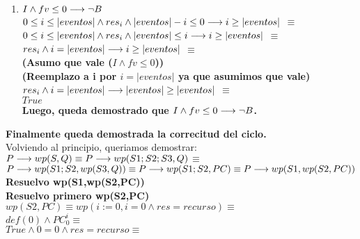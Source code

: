 \documentclass[10pt,a4paper]{article}
\begin{document}
\begin{flushleft}
\begin{enumerate}
	\item \textbf{$I \wedge fv\leq0 \longrightarrow \neg B$} \\
	\vspace{2mm}
	$0\leq i \leq |eventos| \wedge res_i \wedge |eventos|-i \leq 0 \longrightarrow i \geq |eventos|$ $\equiv$ \\
	\vspace{2mm}
	$0\leq i \leq |eventos| \wedge res_i \wedge |eventos| \leq i \longrightarrow i \geq |eventos|$ $\equiv$ \\
	\vspace{2mm}
	$ res_i \wedge i= |eventos| \longrightarrow i \geq |eventos|$ $\equiv$ \\
	\vspace{2mm}
	\textbf{(Asumo que vale ($I \wedge fv\leq0$)) }\\
	\vspace{2mm}
	\textbf{(Reemplazo a i por $i=|eventos|$ ya que asumimos que vale)}\\
	\vspace{2mm}
	$res_i \wedge i=|eventos| \longrightarrow |eventos| \geq |eventos|$ $\equiv$ \\
	$True$ \\
	\vspace{3mm}
	\textbf{Luego, queda demostrado que $I \wedge fv\leq0 \longrightarrow \neg B$.}
\end{enumerate}
\textbf{Finalmente queda demostrada la correcitud del ciclo.}\\
\vspace{2mm}
Volviendo al principio, queriamos demostrar:\\
$P \longrightarrow wp(S,Q) \equiv P\longrightarrow wp(S1;S2;S3,Q)$$ \equiv$\\
$P\longrightarrow wp(S1;S2,wp(S3,Q)) \equiv P\longrightarrow wp(S1;S2,PC) \equiv P\longrightarrow wp(S1,wp(S2,PC)) $\\
\vspace{3mm}
\textbf{Resuelvo wp(S1,wp(S2,PC))}\\
\vspace{2mm}
\textbf{Resuelvo primero wp(S2,PC)}\\
\vspace{2mm}
$wp(S2,PC) \equiv wp(i:=0,i=0 \wedge res=recurso)$$\equiv$\\
\vspace{2mm}
$def (0) \wedge PC_{0}^{i}$$\equiv$\\
\vspace{2mm}
$True \wedge 0=0 \wedge res=recurso$$\equiv$\\
\vspace{2mm}

\end{flushleft}
\end{document}
